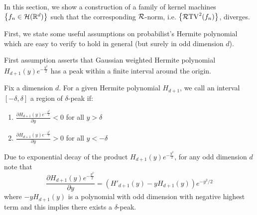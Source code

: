 In this section, we show a construction of a family of kernel machines $\left\{f_n \in {\mathcal{H}}(\mathbb{R}^d)\right\}$ such that the corresponding ${\mathcal{R}}$-norm, i.e. $\left\{\mathcal{R}\mathrm{TV}^2({f_n})\right\}$, diverges. 

First, we state some useful assumptions on probabilist's Hermite polynomial which are easy to verify to hold in general (but surely in odd dimension $d$).

First assumption asserts that Gaussian weighted Hermite polynomial $H_{d+1}(y)e^{-\frac{y^2}{2}}$ has a peak within a finite interval around the origin.
\begin{assumption}\label{ass: peak}
Fix a dimension $d$. For a given Hermite polynomial $H_{d+1}$, we call an interval $[-\delta,\delta]$ a region of $\delta$-peak if:
\begin{enumerate}
    \item $\frac{\partial H_{d+1}(y)e^{-\frac{y^2}{2}}}{\partial y} < 0$ for all $y > \delta$
    \item $\frac{\partial H_{d+1}(y)e^{-\frac{y^2}{2}}}{\partial y} > 0$ for all $y < -\delta$
\end{enumerate}
\end{assumption}
Due to exponential decay of the product $H_{d+1}(y)e^{-\frac{y^2}{2}}$, for any odd dimension $d$ note that 
$$\frac{\partial H_{d+1}(y)e^{-\frac{y^2}{2}}}{\partial y} = (H'_{d+1}(y) - yH_{d+1}(y))e^{-y^2/2}$$
where $-yH_{d+1}(y)$ is a polynomial with odd dimension with negative highest term and this implies there exists a $\delta$-peak.


